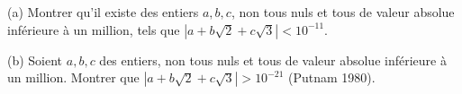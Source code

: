 (a) Montrer qu'il existe des entiers $a, b, c$, non tous nuls et tous de valeur absolue inférieure à un million, tels que $|a + b\sqrt{2} + c\sqrt{3}| < 10^{-11}$.

(b) Soient $a, b, c$ des entiers, non tous nuls et tous de valeur absolue inférieure à un million. Montrer que $|a + b\sqrt{2} + c\sqrt{3}| > 10^{-21}$ (Putnam 1980).
